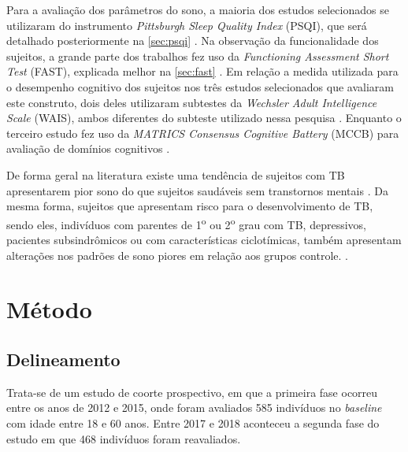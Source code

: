 \documentclass[chapter=TITLE,oneside,12pt,a4paper,english,brazil]{abntex2} %
\begin{document}
    Para a avaliação dos parâmetros do sono, a maioria dos estudos selecionados
    se utilizaram do instrumento \textit{Pittsburgh Sleep Quality Index} (PSQI),
    que será detalhado posteriormente na \autoref{sec:psqi}
    \parencite{buysse_pittsburgh_1989}.
    Na observação da funcionalidade dos sujeitos, a grande parte dos trabalhos
    fez uso da \textit{Functioning Assessment Short Test} (FAST), explicada
    melhor na \autoref{sec:fast}
    \parencite{rosa_validity_2007}.
    Em relação a medida utilizada para o desempenho cognitivo dos sujeitos nos
    três estudos selecionados que avaliaram este construto, dois deles utilizaram
    subtestes da \textit{Wechsler Adult Intelligence Scale} (WAIS), ambos diferentes
    do subteste utilizado nessa pesquisa
    \parencite{wechsler_wais_2004}.
    Enquanto o terceiro estudo fez uso da \textit{MATRICS Consensus Cognitive Battery}
    (MCCB) para avaliação de domínios cognitivos
    \parencite{bo_use_2017,
    nuechterlein_matrics_2008}.

    De forma geral na literatura existe uma tendência de sujeitos com TB
    apresentarem pior sono do que sujeitos saudáveis sem transtornos mentais
    \parencite{boland_associations_2015,
    russo_relationship_2015,
    lai_familiality_2014,
    bradley_sleep_2017,
    st-amand_sleep_2013}.
    Da mesma forma, sujeitos que apresentam risco para o desenvolvimento de TB,
    sendo eles, indivíduos com parentes de 1\textsuperscript{o} ou 2\textsuperscript{o}
    grau com TB, depressivos, pacientes subsindrômicos ou com características
    ciclotímicas, também apresentam alterações nos padrões de sono piores em relação
    aos grupos controle.
    \parencite{zanini_abnormalities_2015,
    ritter_characteristics_2012}.

\vspace{\onelineskip}
\chapter{Método}\label{sec:metodo}

\section{Delineamento}\label{sec:delineamento}

    Trata-se de um estudo de coorte prospectivo, em que a primeira fase ocorreu
    entre os anos de 2012 e 2015, onde foram avaliados 585 indivíduos no
    \textit{baseline} com idade entre 18 e 60 anos.
    Entre 2017 e 2018 aconteceu a segunda fase do estudo em que 468 indivíduos
    foram reavaliados.
\end{document}
